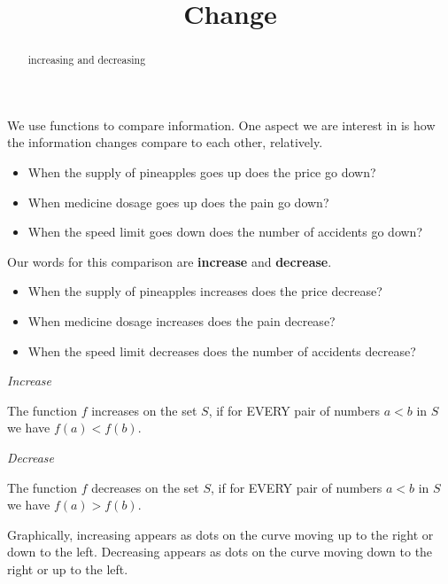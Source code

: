 \documentclass{ximera}
\title{Change}
\begin{document}
\begin{abstract}
increasing and decreasing
\end{abstract}
\maketitle



We use functions to compare information. One aspect we are interest in is how the information changes compare to each other, relatively. 


\begin{itemize}
\item When the supply of pineapples goes up does the price go down?
\item When medicine dosage goes up does the pain go down?
\item When the speed limit goes down does the number of accidents go down?
\end{itemize}


Our words for this comparison are \textbf{increase} and \textbf{decrease}.


\begin{itemize}
\item When the supply of pineapples increases does the price decrease?
\item When medicine dosage increases does the pain decrease?
\item When the speed limit decreases does the number of accidents decrease?
\end{itemize}




\begin{definition} \textit{Increase}

The function $f$ increases on the set $S$, if for EVERY pair of numbers $a < b$ in $S$ we have  $f(a) < f(b)$.


\end{definition}



\begin{definition} \textit{Decrease}

The function $f$ decreases on the set $S$, if for EVERY pair of numbers $a < b$ in $S$ we have  $f(a) > f(b)$.


\end{definition}





Graphically, increasing appears as dots on the curve moving up to the right or down to the left.  Decreasing appears as dots on the curve moving down to the right or up to the left. 
\end{document}
